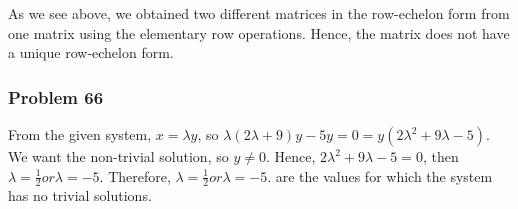 \documentclass[a4paper,12pt]{article}
\begin{document}
As we see above, we obtained two different matrices in the row-echelon form from one matrix using the elementary row operations. Hence, the matrix does not have a unique row-echelon form.
\subsubsection*{Problem 66}
From the given system, $x=\lambda y$, so $\lambda(2 \lambda + 9)y-5y=0=y(2 {\lambda}^2+9 \lambda -5)$. We want the non-trivial solution, so $y \neq 0$. Hence, $2 {\lambda}^2+9 \lambda -5=0$, then $\lambda =\frac{1}{2} or \lambda = -5.$ Therefore, $\lambda =\frac{1}{2} or \lambda = -5.$ are the values for which the system has no trivial solutions.
\end{document}
